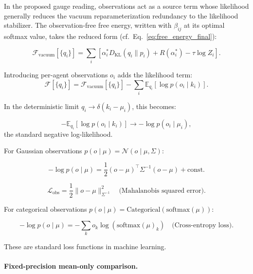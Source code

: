 \documentclass[twoside,11pt]{article}
\begin{document}
In the proposed gauge reading, observations act as a source term whose likelihood generally reduces the vacuum reparameterization redundancy to the likelihood stabilizer. The observation-free free energy, written with $\beta_{ij}$ at its optimal softmax value, takes the reduced form (cf.\ Eq.~\ref{eq:free_energy_final}):

\begin{equation}
\mathcal{F}_{\text{vacuum}}[\{q_i\}]
=\sum_i\left[\alpha_i^*D_{\mathrm{KL}}(q_i\|p_i)+R(\alpha_i^*)-\tau\log Z_i\right].
\end{equation}

Introducing per-agent observations $o_i$ adds the likelihood term:
\begin{equation}
\mathcal{F}[\{q_i\}] = \mathcal{F}_{\text{vacuum}}[\{q_i\}] - \sum_i \mathbb{E}_{q_i}[\log p(o_i \mid k_i)].
\end{equation}

In the deterministic limit $q_i \to \delta(k_i - \mu_i)$, this becomes:

\begin{equation}
-\mathbb{E}_{q_i}[\log p(o_i \mid k_i)] \to -\log p(o_i \mid \mu_i),
\end{equation}
the standard negative log-likelihood.

For Gaussian observations $p(o \mid \mu) = \mathcal{N}(o \mid \mu, \Sigma)$:

\begin{equation}
-\log p(o \mid \mu) = \frac{1}{2}(o - \mu)^\top \Sigma^{-1} (o - \mu) + \text{const.}
\end{equation}

\begin{equation}
\mathcal{L}_{\text{obs}}
=\frac{1}{2}\|o-\mu\|^2_{\Sigma^{-1}}
\quad\text{(Mahalanobis squared error)}.
\end{equation}

For categorical observations $p(o \mid \mu) = \mathrm{Categorical}(\mathrm{softmax}(\mu))$:

\begin{equation}
-\log p(o \mid \mu) = -\sum_k o_k \log(\mathrm{softmax}(\mu)_k) \quad \text{(Cross-entropy loss)}.
\end{equation}

These are standard loss functions in machine learning.


\paragraph{Fixed-precision mean-only comparison.}
\end{document}
